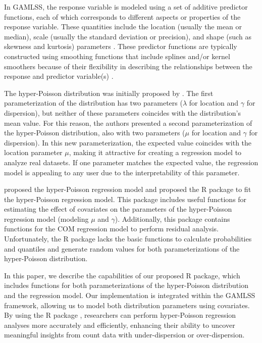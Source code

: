 In GAMLSS, the response variable is modeled using a set of additive predictor functions, each of which corresponds to different aspects or properties of the response variable. These quantities include the location (usually the mean or median), scale (usually the standard deviation or precision), and shape (such as skewness and kurtosis) parameters \citet{Marmolejo-Ramos2023}. These predictor functions are typically constructed using smoothing functions that include splines and/or kernel smoothers because of their flexibility in describing the relationships between the response and predictor variable(s) \citet{elbachir2018}.

The hyper-Poisson distribution was initially proposed by \citet{BardwellCrow1964}. The first parameterization of the distribution has two parameters (\(\lambda\) for location and \(\gamma\) for dispersion), but neither of these parameters coincides with the distribution's mean value. For this reason, the authors presented a second parameterization of the hyper-Poisson distribution, also with two parameters (\(\mu\) for location and \(\gamma\) for dispersion). In this new parameterization, the expected value coincides with the location parameter \(\mu\), making it attractive for creating a regression model to analyze real datasets. If one parameter matches the expected value, the regression model is appealing to any user due to the interpretability of this parameter.

\citet{Saez13} proposed the hyper-Poisson regression model and \citet{DGLMExtPois_pack} proposed the  R package to fit the hyper-Poisson regression model. This package includes useful functions for estimating the effect of covariates on the parameters of the hyper-Poisson regression model (modeling \(\mu\) and \(\gamma\)). Additionally, this package contains functions for the COM regression model \citet{huang2017} to perform residual analysis. Unfortunately, the  R package lacks the basic functions to calculate probabilities and quantiles and generate random values for both parameterizations of the hyper-Poisson distribution.

In this paper, we describe the capabilities of our proposed  R package, which includes functions for both parameterizations of the hyper-Poisson distribution and the regression model. Our implementation is integrated within the GAMLSS framework, allowing us to model both distribution parameters using covariates. By using the  R package \citet{DiscreteDists_pack}, researchers can perform hyper-Poisson regression analyses more accurately and efficiently, enhancing their ability to uncover meaningful insights from count data with under-dispersion or over-dispersion.

